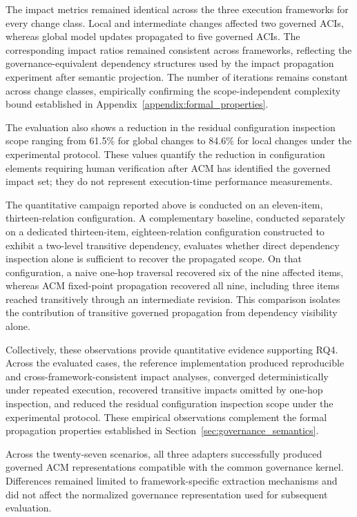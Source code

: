 \documentclass[10pt]{article}
\begin{document}
The impact metrics remained identical across the three execution frameworks for every change class. Local and intermediate changes affected two governed ACIs, whereas global model updates propagated to five governed ACIs. The corresponding impact ratios remained consistent across frameworks, reflecting the governance-equivalent dependency structures used by the impact propagation experiment after semantic projection. The number of iterations remains constant across change classes, empirically confirming the scope-independent complexity bound established in Appendix~\ref{appendix:formal_properties}.

The evaluation also shows a reduction in the residual configuration inspection scope ranging from 61.5\% for global changes to 84.6\% for local changes under the experimental protocol. These values quantify the reduction in configuration elements requiring human verification after ACM has identified the governed impact set; they do not represent execution-time performance measurements. 

The quantitative campaign reported above is conducted on an eleven-item, thirteen-relation configuration. A complementary baseline, conducted separately on a dedicated thirteen-item, eighteen-relation configuration constructed to exhibit a two-level transitive dependency, evaluates whether direct dependency inspection alone is sufficient to recover the propagated scope. On that configuration, a naive one-hop traversal recovered six of the nine affected items, whereas ACM fixed-point propagation recovered all nine, including three items reached transitively through an intermediate revision. This comparison isolates the contribution of transitive governed propagation from dependency visibility alone.

Collectively, these observations provide quantitative evidence supporting RQ4. Across the evaluated cases, the reference implementation produced reproducible and cross-framework-consistent impact analyses, converged deterministically under repeated execution, recovered transitive impacts omitted by one-hop inspection, and reduced the residual configuration inspection scope under the experimental protocol. These empirical observations complement the formal propagation properties established in Section~\ref{sec:governance_semantics}.

Across the twenty-seven scenarios, all three adapters successfully produced governed ACM representations compatible with the common governance kernel. Differences remained limited to framework-specific extraction mechanisms and did not affect the normalized governance representation used for subsequent evaluation.
\end{document}
